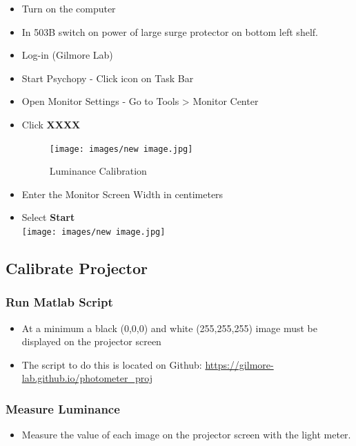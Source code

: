 \documentclass[]{article}
\providecommand{\tightlist}{%
  \setlength{\itemsep}{0pt}\setlength{\parskip}{0pt}}
\begin{document}
\begin{itemize}
\item
  Turn on the computer
\item
  In 503B switch on power of large surge protector on bottom left shelf.
\item
  Log-in (Gilmore Lab)
\item
  Start Psychopy - Click icon on Task Bar
\item
  Open Monitor Settings - Go to Tools \textgreater{} Monitor Center
\item
  Click \textbf{XXXX}

  \begin{figure}
  \centering
  \texttt{[image: images/new image.jpg]}
  \caption{Luminance Calibration}
  \end{figure}
\item
  Enter the Monitor Screen Width in centimeters
\item
  Select \textbf{Start}\\
  \texttt{[image: images/new image.jpg]}
\end{itemize}

\hypertarget{calibrate-projector}{%
\subsection{Calibrate Projector}\label{calibrate-projector}}

\hypertarget{run-matlab-script}{%
\subsubsection{Run Matlab Script}\label{run-matlab-script}}

\begin{itemize}
\tightlist
\item
  At a minimum a black (0,0,0) and white (255,255,255) image must be
  displayed on the projector screen
\item
  The script to do this is located on Github:
  \url{https://gilmore-lab.github.io/photometer_proj}
\end{itemize}

\hypertarget{measure-luminance}{%
\subsubsection{Measure Luminance}\label{measure-luminance}}

\begin{itemize}
\tightlist
\item
  Measure the value of each image on the projector screen with the light
  meter.
\end{itemize}
\end{document}

